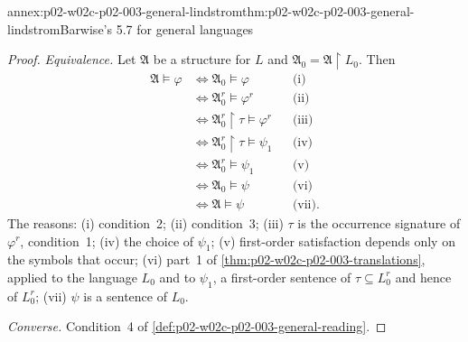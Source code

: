\begin{annexitem}{annex:p02-w02c-p02-003-general-lindstrom}{thm:p02-w02c-p02-003-general-lindstrom}{Barwise's 5.7 for general languages}
\begin{proof}
\emph{Equivalence.}  Let \(\mathfrak A\) be a structure for \(L\) and
\(\mathfrak A_0=\mathfrak A\restriction L_0\).  Then
\begin{align*}
\mathfrak A\models\varphi
 &\iff \mathfrak A_0\models\varphi
   &&\text{(i)}\\
 &\iff \mathfrak A_0^{r}\models\varphi^{r}
   &&\text{(ii)}\\
 &\iff \mathfrak A_0^{r}\restriction\tau\models\varphi^{r}
   &&\text{(iii)}\\
 &\iff \mathfrak A_0^{r}\restriction\tau\models\psi_1
   &&\text{(iv)}\\
 &\iff \mathfrak A_0^{r}\models\psi_1
   &&\text{(v)}\\
 &\iff \mathfrak A_0\models\psi
   &&\text{(vi)}\\
 &\iff \mathfrak A\models\psi
   &&\text{(vii)}.
\end{align*}
The reasons: (i) condition~2; (ii) condition~3; (iii) \(\tau\) is the
occurrence signature of \(\varphi^{r}\), condition~1; (iv) the choice of
\(\psi_1\); (v) first-order satisfaction depends only on the symbols that
occur; (vi) part~1 of \cref{thm:p02-w02c-p02-003-translations}, applied to
the language \(L_0\) and to \(\psi_1\), a first-order sentence of
\(\tau\subseteq L_0^{r}\) and hence of \(L_0^{r}\); (vii) \(\psi\) is a
sentence of \(L_0\).

\emph{Converse.}  Condition~4 of
\cref{def:p02-w02c-p02-003-general-reading}.
\end{proof}
\end{annexitem}

